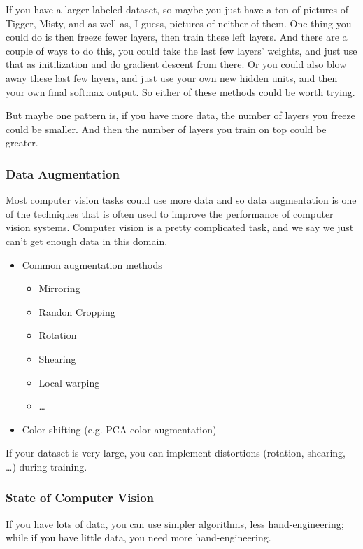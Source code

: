 \documentclass[UTF8]{article}
\begin{document}
If you have a larger labeled dataset, so maybe you just have a ton of pictures of Tigger, Misty,
and as well as, I guess, pictures of neither of them. One thing you could do is then freeze fewer
layers, then train these left layers. And there are a couple of ways to do this, you could take the
last few layers' weights, and just use that as initilization and do gradient descent from there. Or
you could also blow away these last few layers, and just use your own new hidden units, and then
your own final softmax output. So either of these methods could be worth trying.

But maybe one pattern is, if you have more data, the number of layers you freeze could be smaller.
And then the number of layers you train on top could be greater.

\subsubsection{Data Augmentation}
Most computer vision tasks could use more data and so data augmentation is one of the techniques
that is often used to improve the performance of computer vision systems. Computer vision is a
pretty complicated task, and we say we just can't get enough data in this domain.

\begin{itemize}
    \item Common augmentation methods
    \begin{itemize}
        \item Mirroring
        \item Randon Cropping
        \item Rotation
        \item Shearing
        \item Local warping
        \item \ldots
    \end{itemize}
    \item Color shifting (e.g. PCA color augmentation)
\end{itemize}

If your dataset is very large, you can implement distortions (rotation, shearing, \ldots) during
training.

\subsubsection{State of Computer Vision}
If you have lots of data, you can use simpler algorithms, less hand-engineering; while if you have
little data, you need more hand-engineering.
\end{document}

